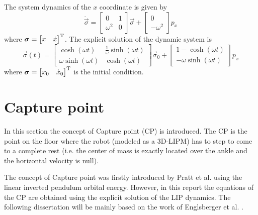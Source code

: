 \par
The system dynamics of the $x$ coordinate is given by
\begin{equation}
  \label{eq:com_dynamic_equation}
  \dot{\vec{\sigma}} =
  \begin{bmatrix}
    0 & 1 \\
    \omega ^2 &  0
  \end{bmatrix}
  \vec{\sigma} + 
  \begin{bmatrix}
    0\\
    - \omega ^2
\end{bmatrix}
p_x
\end{equation}
where $\boldsymbol{\sigma} = \begin{bmatrix} x & \dot{x} \end{bmatrix} ^{\mathrm{T}}$.
The explicit solution of the dynamic system is
\begin{equation}
  \label{eq:lipm_solution}
  \vec{\sigma}(t) =
  \begin{bmatrix}
    \cosh(\omega t) & \frac{1}{\omega} \sinh(\omega t)\\
    \omega \sinh(\omega t) & \cosh(\omega t)
  \end{bmatrix}
  \vec{\sigma}_0 + 
  \begin{bmatrix}
    1-\cosh(\omega t)\\
    - \omega \sinh(\omega t)
  \end{bmatrix}
  p_x
\end{equation}
where $\boldsymbol{\sigma} = \begin{bmatrix} x_0 & \dot{x}_0 \end{bmatrix} ^{\mathrm{T}}$ is the initial
condition.

\newpage

\section{Capture point}
In this section the concept of Capture point (CP) is introduced.
The CP is the point on the floor where the robot (modeled as a 3D-LIPM) has to step to come
to a complete rest (i.e. the center of mass is exactly located over the ankle and the horizontal
velocity is null).
\par
The concept of Capture point was firstly introduced by Pratt et al. \cite{Pratt2006}
using the linear inverted pendulum orbital energy.
However, in this report the equations of the CP are obtained using the explicit solution of
the LIP dynamics. The following dissertation will be mainly based on the work of
Englsberger et al. \cite{Englsberger2011}.

